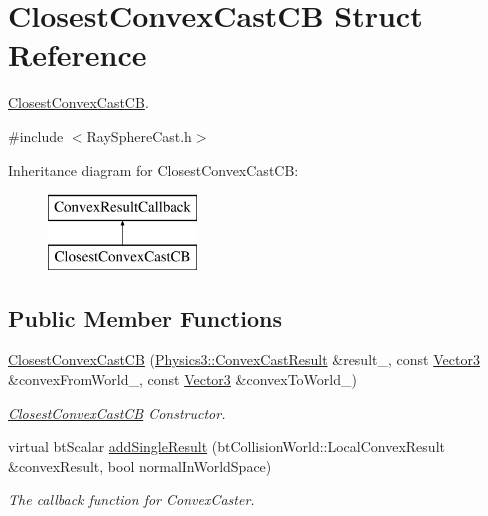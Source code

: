 \hypertarget{struct_closest_convex_cast_c_b}{}\section{Closest\+Convex\+Cast\+CB Struct Reference}
\label{struct_closest_convex_cast_c_b}


\hyperlink{struct_closest_convex_cast_c_b}{Closest\+Convex\+Cast\+CB}.  




{\ttfamily \#include $<$Ray\+Sphere\+Cast.\+h$>$}

Inheritance diagram for Closest\+Convex\+Cast\+CB\+:\begin{figure}[H]
\begin{center}
\leavevmode
\includegraphics[height=2.000000cm]{struct_closest_convex_cast_c_b}
\end{center}
\end{figure}
\subsection*{Public Member Functions}
\begin{DoxyCompactItemize}
\item 
\hyperlink{struct_closest_convex_cast_c_b_a764c109009483b9383b2ddf5d7f9667d}{Closest\+Convex\+Cast\+CB} (\hyperlink{class_magnum_1_1_physics3_1_1_convex_cast_result}{Physics3\+::\+Convex\+Cast\+Result} \&result\+\_\+, const \hyperlink{class_magnum_1_1_vector3}{Vector3} \&convex\+From\+World\+\_\+, const \hyperlink{class_magnum_1_1_vector3}{Vector3} \&convex\+To\+World\+\_\+)
\begin{DoxyCompactList}\small\item\em \hyperlink{struct_closest_convex_cast_c_b}{Closest\+Convex\+Cast\+CB} Constructor. \end{DoxyCompactList}\item 
virtual bt\+Scalar \hyperlink{struct_closest_convex_cast_c_b_ae3c14b42e4d889db0f2ca80b44a14924}{add\+Single\+Result} (bt\+Collision\+World\+::\+Local\+Convex\+Result \&convex\+Result, bool normal\+In\+World\+Space)
\begin{DoxyCompactList}\small\item\em The callback function for Convex\+Caster. \end{DoxyCompactList}\end{DoxyCompactItemize}
